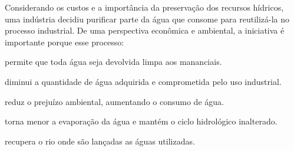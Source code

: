 \questao
Considerando os custos e a importância da preservação dos recursos hídricos, uma indústria decidiu purificar parte da água que consome para reutilizá-la no processo industrial. De uma perspectiva econômica e ambiental, a iniciativa é importante porque esse processo:
\begin{alternativas}
\item permite que toda água seja devolvida limpa aos mananciais.
\item diminui a quantidade de água adquirida e comprometida pelo uso industrial.
\item reduz o prejuízo ambiental, aumentando o consumo de água.
\item torna menor a evaporação da água e mantém o ciclo hidrológico inalterado.
\item recupera o rio onde são lançadas as águas utilizadas.
\end{alternativas}

\questao
